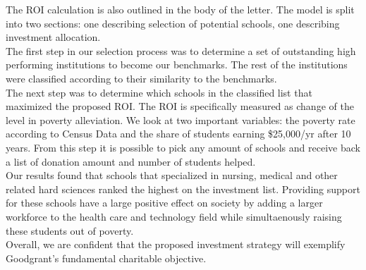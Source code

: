 \documentclass[12pt]{scrartcl}
\begin{document}
The ROI calculation is also outlined in the body of the letter. The model is split into two sections: one describing selection of potential schools, one describing investment allocation. \\

The first step in our selection process was to determine a set of outstanding high performing institutions to become our benchmarks. The rest of the institutions were classified according to their similarity to the benchmarks. \\

The next step was to determine which schools in the classified list that maximized the proposed ROI. The ROI is specifically measured as change of the level in poverty alleviation. We look at two important variables: the poverty rate according to Census Data and the share of students earning \$25,000/yr after 10 years. From this step it is possible to pick any amount of schools and receive back a list of donation amount and number of students helped. \\

Our results found that schools that specialized in nursing, medical and other related hard sciences ranked the highest on the investment list. Providing support for these schools have a large positive effect on society by adding a larger workforce to the health care and technology field while simultaenously raising these students out of poverty. \\

Overall, we are confident that the proposed investment strategy will exemplify Goodgrant’s fundamental charitable objective. 
\newpage
\end{document}
